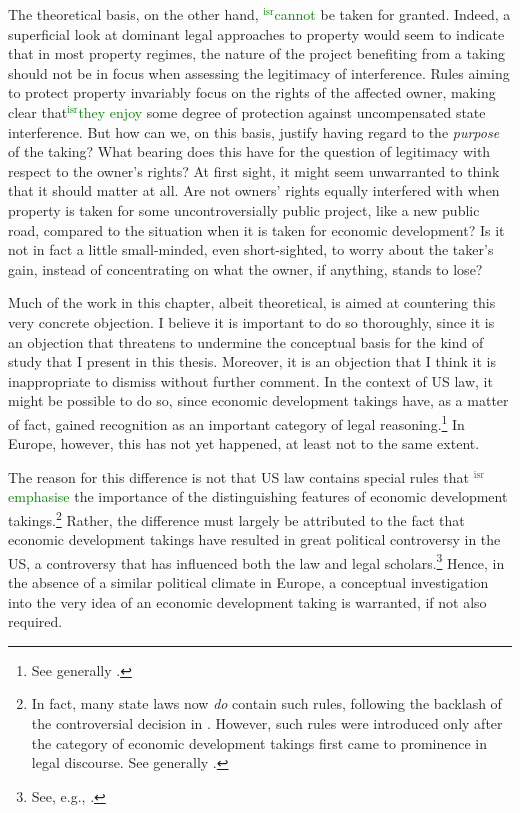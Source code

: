 \documentclass[12pt,a4paper]{book} %
\newcommand{\isr}[1]{\textcolor{green}{$^{\textrm{isr}}${#1}}}
\begin{document}
The theoretical basis, on the other hand, \isr{cannot} be taken for granted. Indeed, a superficial look at dominant legal approaches to property would seem to indicate that in most property regimes, the nature of the project benefiting from a taking should not be in focus when assessing the legitimacy of interference. Rules aiming to protect property invariably focus on the rights of the affected owner, making clear that\isr {they enjoy} some degree of protection against uncompensated state interference. But how can we, on this basis, justify having regard to the {\it purpose} of the taking? What bearing does this have for the question of legitimacy with respect to the owner's rights? At first sight, it might seem unwarranted to think that it should matter at all. Are not owners' rights  equally interfered with when property is taken for some uncontroversially public project, like a new public road, compared to the situation when it is taken for economic development? Is it not in fact a little small-minded, even short-sighted, to worry about the taker's gain, instead of concentrating on what the owner, if anything, stands to lose?

Much of the work in this chapter, albeit theoretical, is aimed at countering this very concrete objection. I believe it is important to do so thoroughly, since it is an objection that threatens to undermine the conceptual basis for the kind of study that I present in this thesis. Moreover, it is an objection that I think it is inappropriate to dismiss without further comment. In the context of US law, it might be possible to do so, since economic development takings have, as a matter of fact, gained recognition as an important category of legal reasoning.\footnote{See generally \cite{cohen06,somin07,malloy08}.}  In Europe, however, this has not yet happened, at least not to the same extent.

The reason for this difference is not that US law contains special rules that \isr{emphasise} the importance of the distinguishing features of economic development takings.\footnote{In fact, many state laws now {\it do} contain such rules, following the backlash of the controversial decision in \cite{kelo05}. However, such rules were introduced only after the category of economic development takings first came to prominence in legal discourse. See generally \cite{eagle08,somin09,jacobs11}.} Rather, the difference must largely be attributed to the fact that economic development takings have resulted in great political controversy in the US, a controversy that has influenced both the law and legal scholars.\footnote{See, e.g., \cite[1190-1192]{somin08}.} Hence, in the absence of a similar political climate in Europe, a conceptual investigation into the very idea of an economic development taking is warranted, if not also required.
\end{document}

